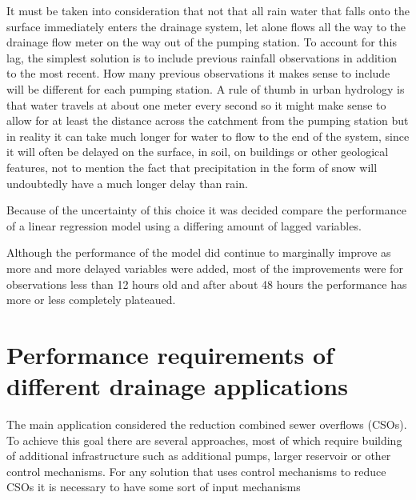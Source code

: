 It must be taken into consideration that not that all rain water that falls onto the surface immediately enters the drainage system, let alone flows all the way to the drainage flow meter on the way out of the pumping station. To account for this lag, the simplest solution is to include previous rainfall observations in addition to the most recent. 
How many previous observations it makes sense to include will be different for each pumping station. A rule of thumb in urban hydrology is that water travels at about one meter every second so it might make sense to allow for at least the distance across the catchment from the pumping station but in reality it can take much longer for water to flow to the end of the system, since it will often be delayed on the surface, in soil, on buildings or other geological features, not to mention the fact that precipitation in the form of snow will undoubtedly have a much longer delay than rain. 

Because of the uncertainty of this choice it was decided compare the performance of a linear regression model using a differing amount of lagged variables. %

Although the performance of the model did continue to marginally improve as more and more delayed variables were added, most of the improvements were for observations less than 12 hours old and after about 48 hours the performance has more or less completely plateaued. 


\section{Performance requirements of different drainage applications}
The main application considered the reduction combined sewer overflows (CSOs). To achieve this goal there are several approaches, most of which require building of additional infrastructure such as additional pumps, larger reservoir or other control mechanisms. For any solution that uses control mechanisms to reduce CSOs it is necessary to have some sort of input mechanisms 




\cite{ThorndahlRadar}